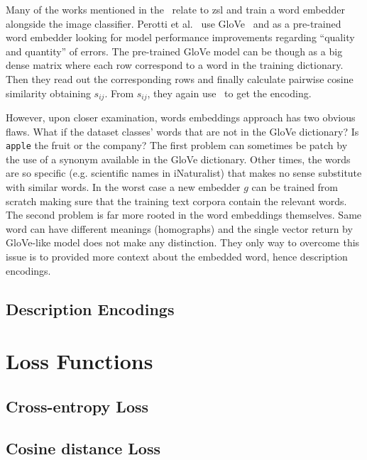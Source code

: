 Many of the works mentioned in the~ relate to
\acrshort{zsl} and train a word embedder alongside the image classifier. Perotti
et al.~\cite{BeyondOneHotPerott2023} use GloVe~\cite{GloveGlobalVPennin2014} and
as a pre-trained word embedder looking for model performance improvements
regarding ``quality and quantity'' of errors. The pre-trained GloVe model
can be though as a big dense matrix where each row correspond to a word in the
training dictionary. Then they read out the corresponding rows and finally
calculate pairwise cosine similarity obtaining $s_{ij}$. From $s_{ij}$, they
again use~ to get the encoding.

However, upon closer examination, words embeddings approach has two obvious
flaws. What if the dataset classes' words that are not in the GloVe dictionary?
Is \texttt{apple} the fruit or the company? The first problem can sometimes be
patch by the use of a synonym available in the GloVe dictionary. Other times,
the words are so specific (e.g. scientific names in iNaturalist) that makes no
sense substitute with similar words. In the worst case a new embedder $g$ can be
trained from scratch making sure that the training text corpora contain the
relevant words. The second problem is far more rooted in the word embeddings
themselves. Same word can have different meanings (homographs) and the single
vector return by GloVe-like model does not make any distinction. They only way
to overcome this issue is to provided more context about the embedded word,
hence description encodings.

\subsection{Description Encodings}
\label{subsec:description-encodings}

\section{Loss Functions}
\label{sec:losses}

\subsection{Cross-entropy Loss}
\label{subsec:cross-entropy-loss}

\subsection{Cosine distance Loss}
\label{subsec:cosine-distance-loss}
